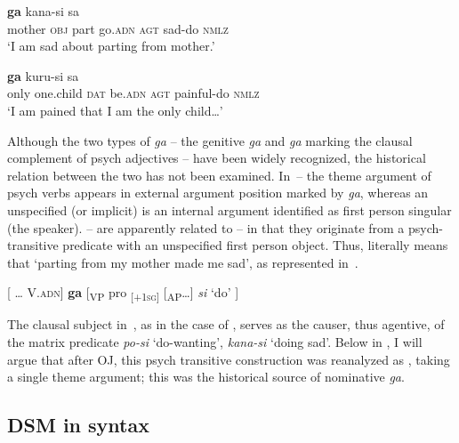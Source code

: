 \documentclass[output=paper]{LSP/langsci}
\begin{document}
\begin{exe}
\ex%
\label{14-ya-ex:18}
\begin{xlist}
\ex
\label{14-ya-ex:18a}
 \textbf{ga} kana-si sa\\ %
mother \textsc{obj} part go.\textsc{adn} \textsc{agt} sad-do \textsc{nmlz}\\
\glt ‘I am sad about parting from mother.’

\ex
\label{14-ya-ex:18b}
 \textbf{ga} kuru-si sa\\ %
only one.child \textsc{dat} be.\textsc{adn} \textsc{agt} painful-do \textsc{nmlz}\\
\glt ‘I am pained that I am the only child…’ 
\end{xlist}
\end{exe}

Although the two types of \textit{ga} – the genitive \textit{ga} and \textit{ga} marking the clausal complement of psych adjectives – have been widely recognized, the historical relation between the two has not been examined. 
In~-- the theme argument of psych verbs appears in external argument position marked by \textit{ga}, whereas an unspecified (or implicit)  is an internal argument identified as first person singular (\ie the speaker).
-- are apparently related to -- in that they originate from a psych-transitive predicate with an unspecified first person  object. Thus,  literally means that ‘parting from my mother made me sad’, as represented in~.

\begin{exe}
\ex
\label{14-ya-ex:19}
 [ … V.\textsc{adn}] \textbf{ga} [\textsubscript{VP} pro\textsubscript{ [+1\textsc{sg}]} [\textsubscript{AP}…] \textit{si} ‘do’ ]
\end{exe}

The clausal subject in~, as in the case of , serves as the causer, thus agentive, of the matrix predicate \textit{po-si} ‘do-wanting’, \textit{kana-si} ‘doing sad’. Below in , I will argue that after OJ, this psych transitive construction was reanalyzed as , taking a single theme argument; this was the historical source of nominative \textit{ga}.


\subsection{DSM in syntax}\label{14-sec:3.3}
\end{document}
